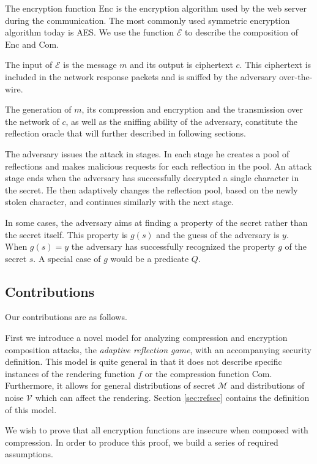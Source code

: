 \documentclass[conference, letterpaper, 10pt]{IEEEtran}
\begin{document}
The encryption function $\textrm{Enc}$ is the encryption algorithm used by the
web server during the communication. The most commonly used symmetric encryption
algorithm today is AES. We use the function $\mathcal{E}$ to describe the
composition of $\textrm{Enc}$ and $\textrm{Com}$.

The input of $\mathcal{E}$ is the message $m$ and its output is ciphertext $c$.
This ciphertext is included in the network response packets and is sniffed by
the adversary over-the-wire.

The generation of $m$, its compression and encryption and the transmission over
the network of $c$, as well as the sniffing ability of the adversary, constitute
the reflection oracle that will further described in following sections.

The adversary issues the attack in stages. In each stage he creates a pool of
reflections and makes malicious requests for each reflection in the pool. An
attack stage ends when the adversary has successfully decrypted a single
character in the secret. He then adaptively changes the reflection pool, based
on the newly stolen character, and continues similarly with the next stage.

In some cases, the adversary aims at finding a property of the secret rather
than the secret itself. This property is $g(s)$ and the guess of the adversary
is $y$. When $g(s) = y$ the adversary has successfully recognized the property
$g$ of the secret $s$. A special case of $g$ would be a predicate $Q$.

\subsection{Contributions}
Our contributions are as follows.

First we introduce a novel model for analyzing compression and encryption
composition attacks, the \textit{adaptive reflection game}, with an accompanying
security definition. This model is quite general in that it does not describe
specific instances of the rendering function $f$ or the compression function
$\textrm{Com}$. Furthermore, it allows for general distributions of secret $\mathcal{M}$
and distributions of noise $\mathcal{V}$ which can affect the rendering. Section
\ref{sec:refsec} contains the definition of this model.

We wish to prove that all encryption functions are insecure when composed with
compression. In order to produce this proof, we build a series of required
assumptions.
\end{document}
